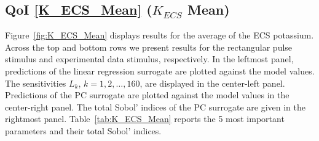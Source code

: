 \documentclass[12pt]{article}
\numberwithin{equation}{section}
\begin{document}
\subsection{QoI \eqref{K_ECS_Mean} ($K_{ECS}$ Mean)}
\label{sec:qoi_K_ECS_Mean}

Figure~\ref{fig:K_ECS_Mean} displays results for the average of the ECS potassium. Across the top and bottom rows we present results for the rectangular pulse stimulus and experimental data stimulus, respectively. In the leftmost panel, predictions of the linear regression surrogate are plotted against the model values. The sensitivities $L_k$, $k=1,2,\dots,160$, are displayed in the center-left panel. Predictions of the PC surrogate are plotted against the model values in the center-right panel. The total Sobol' indices of the PC surrogate are given in the rightmost panel. Table~\ref{tab:K_ECS_Mean} reports the 5 most important parameters and their total Sobol' indices.
\end{document}
